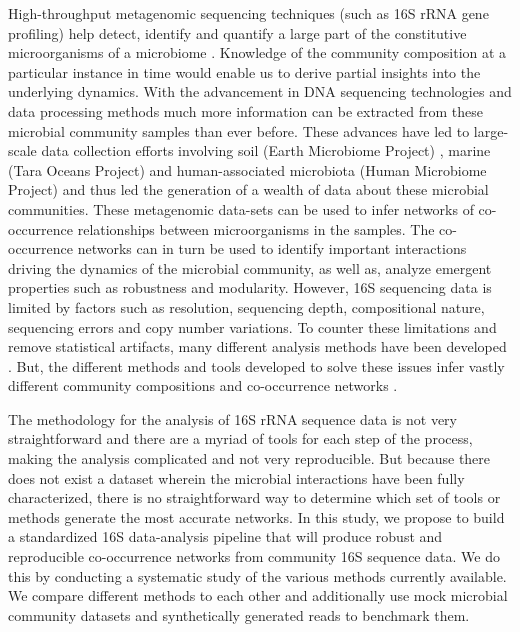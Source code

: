   High-throughput metagenomic sequencing techniques (such as 16S rRNA gene profiling) help detect, identify and quantify a large part of the constitutive microorganisms of a microbiome \cite{Jovel2016}.
  Knowledge of the community composition at a particular instance in time would enable us to derive partial insights into the underlying dynamics.
  With the advancement in DNA sequencing technologies \cite{Narihiro2017} and data processing methods much more information can be extracted from these microbial community samples than ever before.
  These advances have led to large-scale data collection efforts involving soil (Earth Microbiome Project) \cite{Thompson2017}, marine (Tara Oceans Project) \cite{Zhang2015} and human-associated microbiota (Human Microbiome Project) \cite{HumanMicrobiomeProjectConsortium2012} and thus led the generation of a wealth of data about these microbial communities.
  These metagenomic data-sets can be used to infer networks of co-occurrence relationships between microorganisms in the samples.
  The co-occurrence networks can in turn be used to identify important interactions driving the dynamics of the microbial community, as well as, analyze emergent properties such as robustness and modularity.
  However, 16S sequencing data is limited by factors such as resolution, sequencing depth, compositional nature, sequencing errors and copy number variations.
  To counter these limitations and remove statistical artifacts, many different analysis methods have been developed \cite{Callahan2016,Amir2017,Friedman2012,Kurtz2015}.
  But, the different methods and tools developed to solve these issues infer vastly different community compositions and co-occurrence networks \cite{Golob2017,Weiss2016}.

  The methodology for the analysis of 16S rRNA sequence data is not very straightforward and there are a myriad of tools for each step of the process, making the analysis complicated and not very reproducible.
  But because there does not exist a dataset wherein the microbial interactions have been fully characterized, there is no straightforward way to determine which set of tools or methods generate the most accurate networks.
  In this study, we propose to build a standardized 16S data-analysis pipeline that will produce robust and reproducible co-occurrence networks from community 16S sequence data. 
  We do this by conducting a systematic study of the various methods currently available.
  We compare different methods to each other and additionally use mock microbial community datasets and synthetically generated reads to benchmark them.

